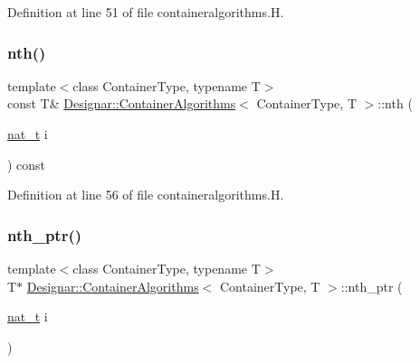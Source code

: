 Definition at line 51 of file containeralgorithms.\+H.

\mbox{\label{class_designar_1_1_container_algorithms_aaf323d0085d4be2e234049b7ea77adf9}} 
\subsubsection{\texorpdfstring{nth()}{nth()}\hspace{0.1cm}{\footnotesize\ttfamily [2/2]}}
{\footnotesize\ttfamily template$<$class Container\+Type, typename T$>$ \\
const T\& \hyperlink{class_designar_1_1_container_algorithms}{Designar\+::\+Container\+Algorithms}$<$ Container\+Type, T $>$\+::nth (\begin{DoxyParamCaption}\item[{\hyperlink{namespace_designar_aa72662848b9f4815e7bf31a7cf3e33d1}{nat\+\_\+t}}]{i }\end{DoxyParamCaption}) const\hspace{0.3cm}{\ttfamily [inline]}}



Definition at line 56 of file containeralgorithms.\+H.

\mbox{\label{class_designar_1_1_container_algorithms_ae05e29e77ab6d57f7ae5e263bec475c6}} 
\subsubsection{\texorpdfstring{nth\+\_\+ptr()}{nth\_ptr()}}
{\footnotesize\ttfamily template$<$class Container\+Type, typename T$>$ \\
T$\ast$ \hyperlink{class_designar_1_1_container_algorithms}{Designar\+::\+Container\+Algorithms}$<$ Container\+Type, T $>$\+::nth\+\_\+ptr (\begin{DoxyParamCaption}\item[{\hyperlink{namespace_designar_aa72662848b9f4815e7bf31a7cf3e33d1}{nat\+\_\+t}}]{i }\end{DoxyParamCaption})\hspace{0.3cm}{\ttfamily [inline]}}



